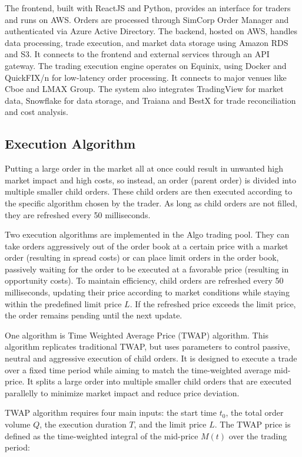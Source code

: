 The frontend, built with ReactJS and Python, provides an interface for traders and runs on AWS. Orders are processed through SimCorp Order Manager and authenticated via Azure Active Directory. The backend, hosted on AWS, handles data processing, trade execution, and market data storage using Amazon RDS and S3. It connects to the frontend and external services through an API gateway. The trading execution engine operates on Equinix, using Docker and QuickFIX/n for low-latency order processing. It connects to major venues like Cboe and LMAX Group. The system also integrates TradingView for market data, Snowflake for data storage, and Traiana and BestX for trade reconciliation and cost analysis.

\subsection{Execution Algorithm}
Putting a large order in the market all at once could result in unwanted high market impact and high costs, so instead, an order (parent order) is divided into multiple smaller child orders. These child orders are then executed according to the specific algorithm chosen by the trader. As long as child orders are not filled, they are refreshed every 50 milliseconds. 

Two execution algorithms are implemented in the Algo trading pool. They can take orders aggressively out of the order book at a certain price with a market order (resulting in spread costs) or can place limit orders in the order book, passively waiting for the order to be executed at a favorable price (resulting in opportunity costs). To maintain efficiency, child orders are refreshed every 50 milliseconds, updating their price according to market conditions while staying within the predefined limit price $L$. If the refreshed price exceeds the limit price, the order remains pending until the next update.

One algorithm is Time Weighted Average Price (TWAP) algorithm. This algorithm replicates traditional TWAP, but uses parameters to control passive, neutral and aggressive execution of child orders. It is designed to execute a trade over a fixed time period while aiming to match the time-weighted average mid-price. It splits a large order into multiple smaller child orders that are executed parallelly to minimize market impact and reduce price deviation.

TWAP algorithm requires four main inputs: the start time $t_0$, the total order volume $Q$, the execution duration $T$, and the limit price $L$. The TWAP price is defined as the time-weighted integral of the mid-price $M(t)$ over the trading period:

